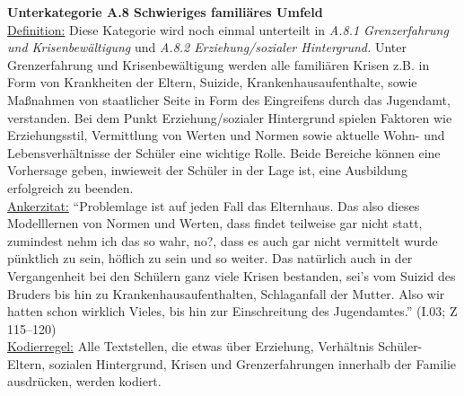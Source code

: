 \textbf{Unterkategorie A.8 Schwieriges familiäres Umfeld}\\
\underline{Definition:} Diese Kategorie wird noch einmal unterteilt in \textit{A.8.1 Grenzerfahrung und Krisenbewältigung} und \textit{A.8.2 Erziehung/sozialer Hintergrund.} Unter Grenzerfahrung und Krisenbewältigung werden alle familiären Krisen z.B. in Form von Krankheiten der Eltern, Suizide, Krankenhausaufenthalte, sowie Maßnahmen von staatlicher Seite in Form des Eingreifens durch das Jugendamt, verstanden. Bei dem Punkt Erziehung/sozialer Hintergrund spielen Faktoren wie Erziehungsstil, Vermittlung von Werten und Normen sowie aktuelle Wohn- und Lebensverhältnisse der Schüler eine wichtige Rolle. Beide Bereiche können eine Vorhersage geben, inwieweit der Schüler in der Lage ist, eine Ausbildung erfolgreich zu beenden.\\
\underline{Ankerzitat:} "`Problemlage ist auf jeden Fall das Elternhaus. Das also dieses Modelllernen von Normen und Werten, dass findet teilweise gar nicht statt, zumindest nehm ich das so wahr, no?, dass es auch gar nicht vermittelt wurde pünktlich zu sein, höflich zu sein und so weiter. Das natürlich auch in der Vergangenheit bei den Schülern ganz viele Krisen bestanden, sei's vom Suizid des Bruders bis hin zu Krankenhausaufenthalten, Schlaganfall der Mutter. Also wir hatten schon wirklich Vieles, bis hin zur Einschreitung des Jugendamtes."' (I.03; Z 115--120)\\
\underline{Kodierregel:} Alle Textstellen, die etwas über Erziehung, Verhältnis Schüler-Eltern, sozialen Hintergrund, Krisen und Grenzerfahrungen innerhalb der Familie ausdrücken, werden kodiert.\\

